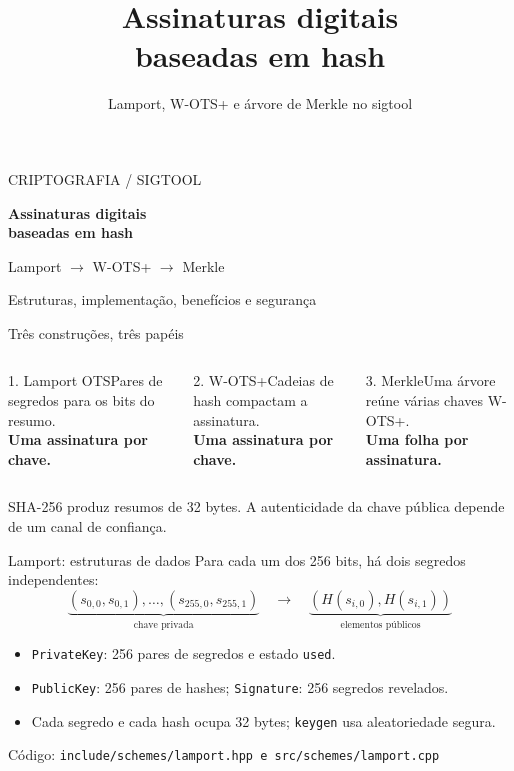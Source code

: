 \documentclass[aspectratio=169,11pt]{beamer}
\title{Assinaturas digitais\\baseadas em hash}
\subtitle{Lamport, W-OTS+ e árvore de Merkle no sigtool}
\date{}
\newcommand{\code}[1]{\texttt{#1}}
\newcommand{\src}[1]{\vfill{\scriptsize\color{muted} Código: \texttt{#1}}}
\begin{document}
\begin{frame}[plain]
  \vspace{0.7cm}
  {\color{teal}\large CRIPTOGRAFIA \quad / \quad SIGTOOL}\par\vspace{0.5cm}
  {\Huge\bfseries Assinaturas digitais\\baseadas em hash}\par\vspace{0.55cm}
  {\Large Lamport \quad $\rightarrow$ \quad W-OTS+ \quad $\rightarrow$ \quad Merkle}\par\vspace{0.4cm}
  {\color{muted} Estruturas, implementação, benefícios e segurança}
\end{frame}

\begin{frame}{Três construções, três papéis}
\begin{columns}[T,onlytextwidth]
\begin{block}{1. Lamport OTS}Pares de segredos para os bits do resumo.\\\textbf{Uma assinatura por chave.}\end{block}
\begin{block}{2. W-OTS+}Cadeias de hash compactam a assinatura.\\\textbf{Uma assinatura por chave.}\end{block}
\begin{block}{3. Merkle}Uma árvore reúne várias chaves W-OTS+.\\\textbf{Uma folha por assinatura.}\end{block}
\end{columns}
\vspace{0.45cm}
SHA-256 produz resumos de 32 bytes. A autenticidade da chave pública depende de um canal de confiança.
\end{frame}

\begin{frame}{Lamport: estruturas de dados}
Para cada um dos 256 bits, há dois segredos independentes:
\[
\underbrace{(s_{0,0},s_{0,1}),\ldots,(s_{255,0},s_{255,1})}_{\text{chave privada}}
\quad\longrightarrow\quad
\underbrace{(H(s_{i,0}),H(s_{i,1}))}_{\text{elementos públicos}}
\]
\begin{itemize}
\item \code{PrivateKey}: 256 pares de segredos e estado \code{used}.
\item \code{PublicKey}: 256 pares de hashes; \code{Signature}: 256 segredos revelados.
\item Cada segredo e cada hash ocupa 32 bytes; \code{keygen} usa aleatoriedade segura.
\end{itemize}
\src{include/schemes/lamport.hpp \quad e \quad src/schemes/lamport.cpp}
\end{frame}
\end{document}

